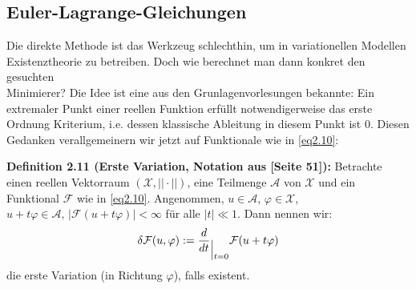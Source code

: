 \subsection{Euler-Lagrange-Gleichungen}{\label{subsec:eleq}}
Die direkte Methode ist das Werkzeug schlechthin, um in variationellen Modellen Existenztheorie zu betreiben. Doch wie berechnet man dann konkret den gesuchten \\Minimierer? Die Idee ist eine aus den Grunlagenvorlesungen bekannte: Ein extremaler Punkt einer reellen Funktion erfüllt notwendigerweise das erste Ordnung Kriterium, i.e. dessen klassische Ableitung in diesem Punkt ist 0. Diesen Gedanken verallgemeinern wir jetzt auf Funktionale wie in \eqref{eq2.10}:\\[0.5cm]
\colorbox{generalYellow}{\begin{minipage}{16cm}{\textcolor{black}{}{\label{def2.11}}}
\textbf{Definition 2.11 (Erste Variation, Notation aus \cite{CalcVarSchmidt}[Seite 51]):} Betrachte einen reellen Vektorraum \((\mathcal{X},||\cdot||)\), eine Teilmenge \(\mathcal{A}\) von \(\mathcal{X}\) und ein Funktional \(\mathcal{F}\) wie in \eqref{eq2.10}. Angenommen, \(u \in \mathcal{A}, \, \varphi \in \mathcal{X}\), \(u+t\varphi \in \mathcal{A}, \, |\mathcal{F}(u+t\varphi)|<\infty\) für alle \(|t| \ll 1\). Dann nennen wir: 
\begin{equation}
    \delta \mathcal{F}(u,\varphi) := \frac{d}{dt}_{\einschraenkung t=0} \mathcal{F}(u+t\varphi)
\end{equation}
die erste Variation (in Richtung \(\varphi\)), falls existent.
\end{minipage}}\\

